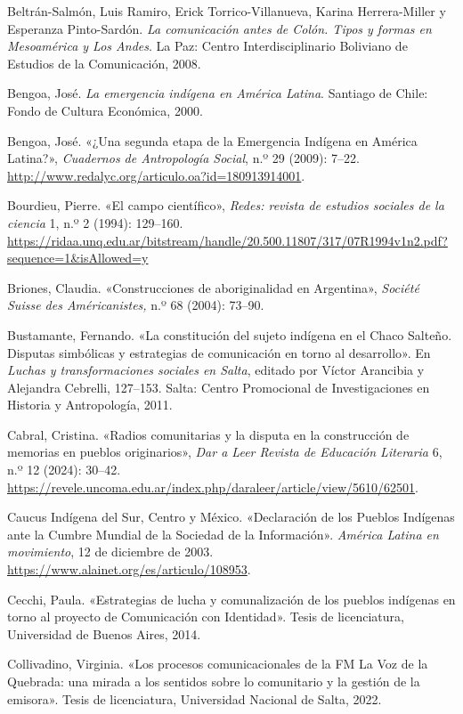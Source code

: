 \documentclass{tufte-handout}
\begin{document}
\begin{hangparas}{.25in}{1}
Beltrán-Salmón, Luis Ramiro, Erick Torrico-Villanueva, Karina
Herrera-Miller y Esperanza Pinto-Sardón. \emph{La comunicación antes de
Colón. Tipos y formas en Mesoamérica y Los Andes}. La Paz: Centro
Interdisciplinario Boliviano de Estudios de la Comunicación, 2008.

Bengoa, José. \emph{La emergencia indígena en América Latina}. Santiago
de Chile: Fondo de Cultura Económica, 2000.

Bengoa, José. «¿Una segunda etapa de la Emergencia Indígena en América
Latina?», \emph{Cuadernos de Antropología Social}, n.º 29 (2009): 7--22.
\url{http://www.redalyc.org/articulo.oa?id=180913914001}.

Bourdieu, Pierre. «El campo científico», \emph{Redes: revista de
estudios sociales de la ciencia} 1, n.º 2 (1994): 129--160.
\url{https://ridaa.unq.edu.ar/bitstream/handle/20.500.11807/317/07R1994v1n2.pdf?sequence=1\&isAllowed=y}

Briones, Claudia. «Construcciones de aboriginalidad en Argentina»,
\emph{Société Suisse des Américanistes,} n.º 68 (2004): 73--90.

Bustamante, Fernando. «La constitución del sujeto indígena en el Chaco
Salteño. Disputas simbólicas y estrategias de comunicación en torno al
desarrollo». En \emph{Luchas y transformaciones sociales en Salta},
editado por Víctor Arancibia y Alejandra Cebrelli, 127--153. Salta:
Centro Promocional de Investigaciones en Historia y Antropología, 2011.

Cabral, Cristina. «Radios comunitarias y la disputa en la construcción
de memorias en pueblos originarios», \emph{Dar a Leer Revista de
Educación Literaria} 6, n.º 12 (2024): 30--42.
\url{https://revele.uncoma.edu.ar/index.php/daraleer/article/view/5610/62501}.

Caucus Indígena del Sur, Centro y México. «Declaración de los Pueblos
Indígenas ante la Cumbre Mundial de la Sociedad de la Información».
\emph{América Latina en movimiento}, 12 de diciembre de 2003.
\url{https://www.alainet.org/es/articulo/108953}.

Cecchi, Paula. «Estrategias de lucha y comunalización de los pueblos
indígenas en torno al proyecto de Comunicación con Identidad». Tesis de
licenciatura, Universidad de Buenos Aires, 2014.

Collivadino, Virginia. «Los procesos comunicacionales de la FM La Voz de
la Quebrada: una mirada a los sentidos sobre lo comunitario y la gestión
de la emisora». Tesis de licenciatura, Universidad Nacional de Salta,
2022.


\end{hangparas}
\end{document}
